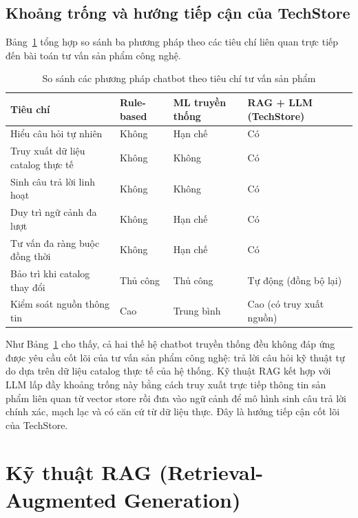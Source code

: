 \subsection{Khoảng trống và hướng tiếp cận của TechStore}
\label{subsec:c2_gap}

Bảng~\ref{tab:chatbot_comparison} tổng hợp so sánh ba phương pháp theo các tiêu chí liên quan trực tiếp đến bài toán tư vấn sản phẩm công nghệ.

\begin{table}[H]
  \centering
  \caption{So sánh các phương pháp chatbot theo tiêu chí tư vấn sản phẩm}
  \label{tab:chatbot_comparison}
  \begin{tabular}{|p{4cm}|p{2.5cm}|p{2.5cm}|p{3.5cm}|}
    \hline
    \textbf{Tiêu chí} & \textbf{Rule-based} & \textbf{ML truyền thống} & \textbf{RAG + LLM (TechStore)} \\
    \hline
    Hiểu câu hỏi tự nhiên & Không & Hạn chế & Có \\
    \hline
    Truy xuất dữ liệu catalog thực tế & Không & Không & Có \\
    \hline
    Sinh câu trả lời linh hoạt & Không & Không & Có \\
    \hline
    Duy trì ngữ cảnh đa lượt & Không & Hạn chế & Có \\
    \hline
    Tư vấn đa ràng buộc đồng thời & Không & Hạn chế & Có \\
    \hline
    Bảo trì khi catalog thay đổi & Thủ công & Thủ công & Tự động (đồng bộ lại) \\
    \hline
    Kiểm soát nguồn thông tin & Cao & Trung bình & Cao (có truy xuất nguồn) \\
    \hline
  \end{tabular}
\end{table}

Như Bảng~\ref{tab:chatbot_comparison} cho thấy, cả hai thế hệ chatbot truyền thống đều không đáp ứng được yêu cầu cốt lõi của tư vấn sản phẩm công nghệ: trả lời câu hỏi kỹ thuật tự do dựa trên dữ liệu catalog thực tế của hệ thống. Kỹ thuật RAG kết hợp với LLM lấp đầy khoảng trống này bằng cách truy xuất trực tiếp thông tin sản phẩm liên quan từ vector store rồi đưa vào ngữ cảnh để mô hình sinh câu trả lời chính xác, mạch lạc và có căn cứ từ dữ liệu thực. Đây là hướng tiếp cận cốt lõi của TechStore.

\section{Kỹ thuật RAG (Retrieval-Augmented Generation)}
\label{sec:c2_rag}

